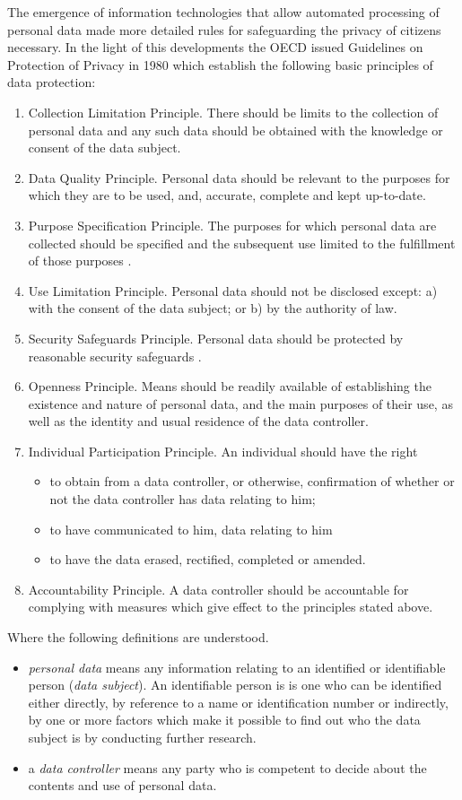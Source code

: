 The emergence of information technologies that allow automated processing of personal data made more detailed rules for safeguarding the privacy of citizens necessary.
In the light of this developments the OECD  \cite{OECD80} issued Guidelines on Protection of Privacy in 1980 which establish the following basic principles of data protection:
\begin{enumerate}
\item Collection Limitation Principle.
  There should be limits to the collection of personal data and any such data should be obtained \om with the knowledge or consent of the data subject.
\item Data Quality Principle.
  Personal data should be relevant to the purposes for which they are to be used, and,  \om accurate, complete and kept up-to-date.
\item Purpose Specification Principle.
  The purposes for which personal data are collected should be specified \om and the subsequent use limited to the fulfillment of those purposes \om.
\item Use Limitation Principle.
  Personal data should not be disclosed \om except: a) with the consent of the data subject; or b) by the authority of law.
\item Security Safeguards Principle.
  Personal data should be protected by reasonable security safeguards \om.
\item Openness Principle.
  {\om} Means should be readily available of establishing the existence and nature of personal data, and the main purposes of their use, as well as the identity and usual residence of the data controller.
\item Individual Participation Principle.
  An individual should have the right
  \begin{itemize}
  \item to obtain from a data controller, or otherwise, confirmation of whether or not the data controller has data relating to him;
  \item to have communicated to him, data relating to him \om
  \item \om to have the data erased, rectified, completed or amended.
  \end{itemize}
\item Accountability Principle.
  A data controller should be accountable for complying with measures which give effect to the principles stated above.
\end{enumerate}

Where the following definitions are understood.
\begin{itemize}
\item \emph{personal data} means any information relating to an identified or identifiable person (\emph{data subject}).
  An identifiable person is is one who can be identified either directly, by reference to a name or identification number or indirectly,
  by one or more factors which make it possible to find out who the data subject is by conducting further research.
\item a \emph{data controller} means any party who is competent to decide about the contents and use of personal data.
\end{itemize}

